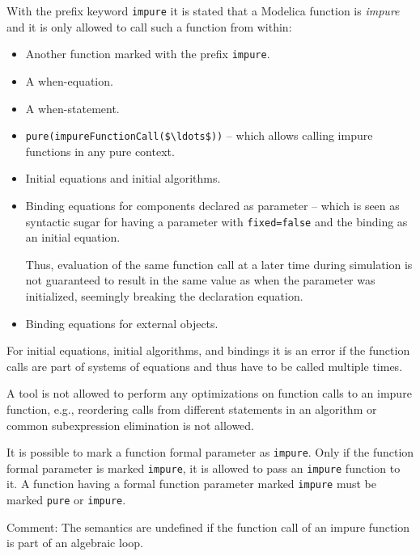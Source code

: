 With the prefix keyword \lstinline!impure! it is stated that a Modelica
function is \emph{impure} and it is only allowed to call such a function
from within:
\begin{itemize}
\item
  Another function marked with the prefix \lstinline!impure!.
\item
  A when-equation.
\item
  A when-statement.
\item
  \lstinline!pure(impureFunctionCall($\ldots$))! -- which allows calling impure functions in any pure context.
\item
  Initial equations and initial algorithms.
\item
  Binding equations for components declared as parameter -- which is seen as syntactic sugar for having a parameter with \lstinline!fixed=false! and the binding as an initial equation.
  \begin{nonnormative}
  Thus, evaluation of the same function call at a later time during simulation is not guaranteed to result in the same value as when the parameter
  was initialized, seemingly breaking the declaration equation.
  \end{nonnormative}
\item
  Binding equations for external objects.
\end{itemize}

For initial equations, initial algorithms, and bindings it is an error
if the function calls are part of systems of equations and thus have to
be called multiple times.

\begin{nonnormative}
A tool is not allowed to perform any optimizations on function
calls to an impure function, e.g., reordering calls from different
statements in an algorithm or common subexpression elimination is not
allowed.
\end{nonnormative}

It is possible to mark a function formal parameter as \lstinline!impure!. Only if
the function formal parameter is marked \lstinline!impure!, it is allowed to pass an
\lstinline!impure! function to it. A function having a formal function parameter
marked \lstinline!impure! must be marked \lstinline!pure! or \lstinline!impure!.

\begin{nonnormative}
Comment: The semantics are undefined if the function call of an
impure function is part of an algebraic loop.
\end{nonnormative}

